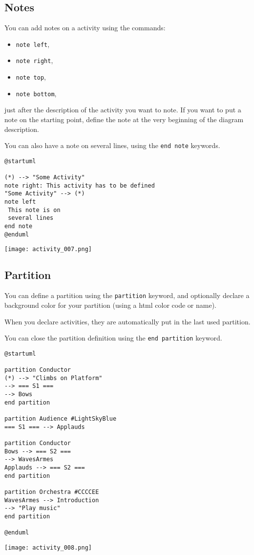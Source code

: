 \newpage \subsection{Notes}

You can add notes on a activity using the commands:
\begin{itemize}
  \item \texttt{note left},
  \item \texttt{note right},
  \item \texttt{note top},
  \item \texttt{note bottom},
\end{itemize}
just after the description of the activity you want to note.
If you want to put a note on the starting point, define the note at the very
beginning of the diagram description.

You can also have a note on several lines, using the \texttt{end note} keywords.

\begin{lstlisting}
@startuml

(*) --> "Some Activity"
note right: This activity has to be defined
"Some Activity" --> (*)
note left
 This note is on
 several lines
end note
@enduml
\end{lstlisting}
\begin{center}
\texttt{[image: activity\_007.png]}
\end{center}

\newpage \subsection{Partition}

\begin{description}
\item You can define a partition using the \texttt{partition} keyword, and
optionally declare a background color for your partition (using a html color code or name).
\item When you declare activities, they are automatically put in the last used partition.
\end{description}

You can close the partition definition using the \texttt{end partition} keyword.

\begin{lstlisting}
@startuml

partition Conductor
(*) --> "Climbs on Platform"
--> === S1 ===
--> Bows
end partition

partition Audience #LightSkyBlue
=== S1 === --> Applauds

partition Conductor
Bows --> === S2 ===
--> WavesArmes
Applauds --> === S2 ===
end partition

partition Orchestra #CCCCEE
WavesArmes --> Introduction
--> "Play music"
end partition

@enduml
\end{lstlisting}
\begin{center}
\texttt{[image: activity\_008.png]}
\end{center}
		
